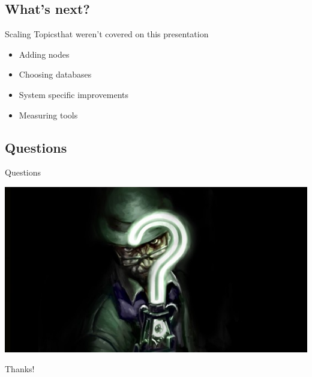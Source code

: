 \documentclass[utf8]{beamer}
\begin{document}
\subsection{What's next?}
\begin{frame}{Scaling Topics}{that weren't covered on this presentation}
	\begin{itemize}
		\item Adding nodes
		\item Choosing databases
		\item System specific improvements
		\item Measuring tools
	\end{itemize}
\end{frame}
\subsection{Questions}
\begin{frame}{Questions}
	\begin{center}
		\includegraphics[width=\textwidth]{img/theriddler.jpg}
	\end{center}
\end{frame}

\appendix

\begin{frame}
	\begin{center}
		{\Huge Thanks!}
	\end{center}
\end{frame}
\end{document}
